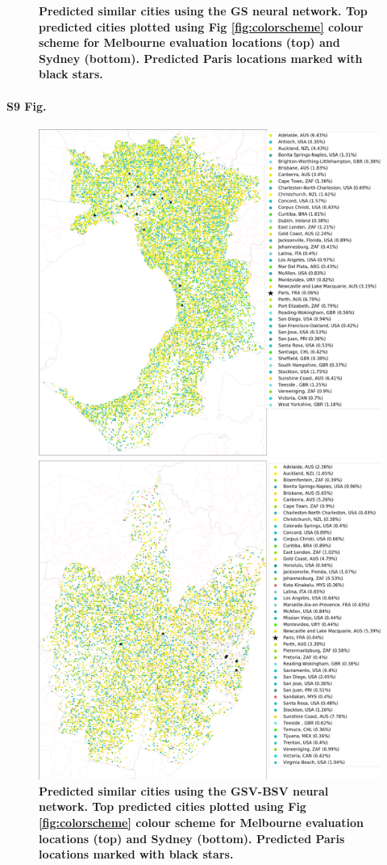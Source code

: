 \documentclass[10pt,letterpaper,hidelinks]{article}
\begin{document}
\begin{figure}[!htbp]
\caption{\bf Predicted similar cities using the GS neural network. Top predicted cities plotted using Fig \ref{fig:colorscheme} colour scheme for Melbourne evaluation locations (top) and Sydney (bottom). Predicted Paris locations marked with black stars.} 
 \label{fig:melsat}  
\end{figure} 

\paragraph*{S9 Fig.}
\begin{figure}[!htbp]
\centering    
\includegraphics[scale=0.16]{Images/PlosOne/Fig9.png} 
\caption{\bf Predicted similar cities using the GSV-BSV neural network. Top predicted cities plotted using Fig \ref{fig:colorscheme} colour scheme for Melbourne evaluation locations (top) and Sydney (bottom). Predicted Paris locations marked with black stars.}   
 \label{fig:melstreet}  
\end{figure}
\end{document}
